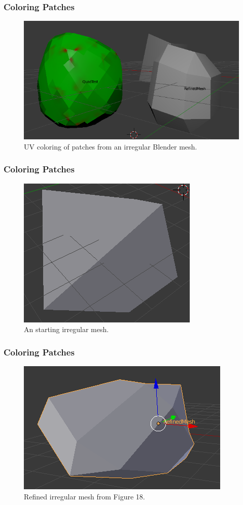\documentclass[11pt]{beamer}
\begin{document}
	\begin{frame}
		\frametitle{Coloring Patches}
		\begin{figure}
			\centering
			\includegraphics[width=.73\linewidth]{img/ir_1_color}
			\caption{UV coloring of patches from an irregular Blender mesh.}
		\end{figure}
	\end{frame}
	
	
	\begin{frame}
		\frametitle{Coloring Patches}
		\begin{figure}
			\centering
			\includegraphics[width=.43\linewidth]{img/solid_ir_2}
			\caption{An starting irregular mesh.}
		\end{figure}
	\end{frame}

	\begin{frame}
		\frametitle{Coloring Patches}
		\begin{figure}
			\centering
			\includegraphics[width=.43\linewidth]{img/refined_ir_2}
			\caption{Refined irregular mesh from Figure 18.}
		\end{figure}
	\end{frame}
		
\end{document}
